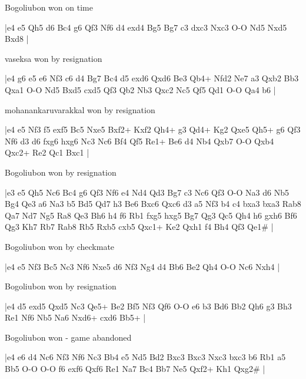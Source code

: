 \showboard

Bogoliubon won on time

\makegametitle
|e4 e5 Qh5 d6 Bc4 g6 Qf3 Nf6 d4 exd4 Bg5 Bg7 c3 dxc3 Nxc3 O-O Nd5 Nxd5 Bxd8  |

\showboard

vaseksa won by resignation

\makegametitle
|e4 g6 e5 e6 Nf3 c6 d4 Bg7 Bc4 d5 exd6 Qxd6 Be3 Qb4+ Nfd2 Ne7 a3 Qxb2 Bb3 Qxa1 O-O Nd5 Bxd5 cxd5 Qf3 Qb2 Nb3 Qxc2 Nc5 Qf5 Qd1 O-O Qa4 b6  |

\showboard

mohanankaruvarakkal won by resignation

\makegametitle
|e4 e5 Nf3 f5 exf5 Bc5 Nxe5 Bxf2+ Kxf2 Qh4+ g3 Qd4+ Kg2 Qxe5 Qh5+ g6 Qf3 Nf6 d3 d6 fxg6 hxg6 Nc3 Nc6 Bf4 Qf5 Re1+ Be6 d4 Nb4 Qxb7 O-O Qxb4 Qxc2+ Re2 Qc1 Bxc1  |

\showboard

Bogoliubon won by resignation

\makegametitle
|e3 e5 Qh5 Nc6 Bc4 g6 Qf3 Nf6 e4 Nd4 Qd3 Bg7 c3 Nc6 Qf3 O-O Na3 d6 Nb5 Bg4 Qe3 a6 Na3 b5 Bd5 Qd7 h3 Be6 Bxc6 Qxc6 d3 a5 Nf3 b4 c4 bxa3 bxa3 Rab8 Qa7 Nd7 Ng5 Ra8 Qe3 Bh6 h4 f6 Rb1 fxg5 hxg5 Bg7 Qg3 Qc5 Qh4 h6 gxh6 Bf6 Qg3 Kh7 Rb7 Rab8 Rb5 Rxb5 cxb5 Qxc1+ Ke2 Qxh1 f4 Bh4 Qf3 Qe1\#  |

\showboard

Bogoliubon won by checkmate

\makegametitle
|e4 e5 Nf3 Bc5 Nc3 Nf6 Nxe5 d6 Nf3 Ng4 d4 Bb6 Be2 Qh4 O-O Nc6 Nxh4  |

\showboard

Bogoliubon won by resignation

\makegametitle
|e4 d5 exd5 Qxd5 Nc3 Qe5+ Be2 Bf5 Nf3 Qf6 O-O e6 b3 Bd6 Bb2 Qh6 g3 Bh3 Re1 Nf6 Nb5 Na6 Nxd6+ cxd6 Bb5+  |

\showboard

Bogoliubon won - game abandoned

\makegametitle
|e4 e6 d4 Nc6 Nf3 Nf6 Nc3 Bb4 e5 Nd5 Bd2 Bxc3 Bxc3 Nxc3 bxc3 b6 Rb1 a5 Bb5 O-O O-O f6 exf6 Qxf6 Re1 Na7 Bc4 Bb7 Ne5 Qxf2+ Kh1 Qxg2\#  |

